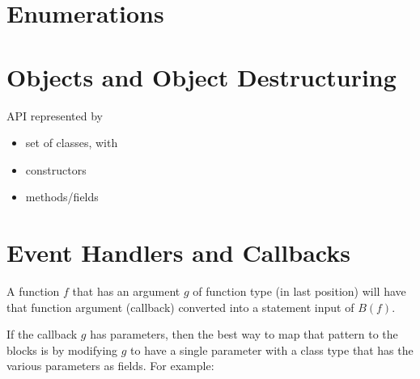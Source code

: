 \documentclass[sigplan,10pt]{acmart}
\begin{document}




\section{Enumerations}

\section{Objects and Object Destructuring}
API represented by
\begin{itemize}
  \item set of classes, with
  \item constructors
  \item methods/fields
\end{itemize}

\section{Event Handlers and Callbacks}


A function $f$ that has an argument $g$ of function type (in last position) will have
that function argument (callback) converted into a statement input of $B(f)$.

If the callback $g$ has parameters, then
the best way to map that pattern to the blocks is by modifying
$g$ to have a single parameter with a class type that has the
various parameters as fields.
For example:

\end{document}
